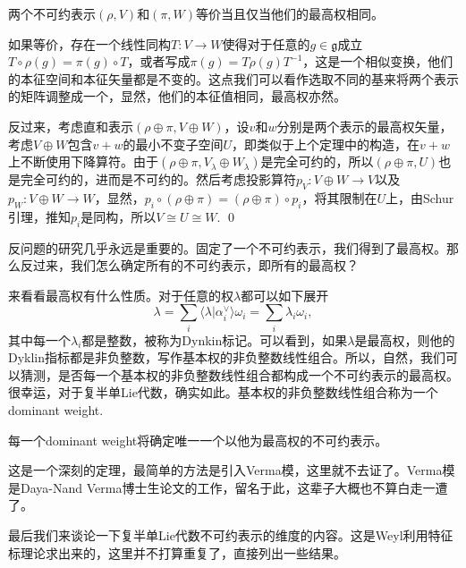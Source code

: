 \documentclass[9pt]{extarticle}
\newcommand{\lag}{{\mathfrak{g}}}
\begin{document}
\theo 两个不可约表示$(\rho,V)$和$(\pi,W)$等价当且仅当他们的最高权相同。

\proof 如果等价，存在一个线性同构$T:V\to W$使得对于任意的$g\in\lag$成立$T\circ \rho(g)=\pi(g)\circ T$，或者写成$\pi(g)=T\rho(g)T^{-1}$，这是一个相似变换，他们的本征空间和本征矢量都是不变的。这点我们可以看作选取不同的基来将两个表示的矩阵调整成一个，显然，他们的本征值相同，最高权亦然。

反过来，考虑直和表示$(\rho\oplus\pi,V\oplus W)$，设$v$和$w$分别是两个表示的最高权矢量，考虑$V\oplus W$包含$v+w$的最小不变子空间$U$，即类似于上个定理中的构造，在$v+w$上不断使用下降算符。由于$(\rho\oplus\pi,V_\lambda\oplus W_\lambda)$是完全可约的，所以$(\rho\oplus\pi,U)$也是完全可约的，进而是不可约的。然后考虑投影算符$p_V:V\oplus W\to V$以及$p_W:V\oplus W\to W$，显然，$p_i\circ (\rho\oplus\pi)=(\rho\oplus\pi)\circ p_i$，将其限制在$U$上，由Schur引理，推知$p_i$是同构，所以$V\cong U\cong W$. \qed

\para 反问题的研究几乎永远是重要的。固定了一个不可约表示，我们得到了最高权。那么反过来，我们怎么确定所有的不可约表示，即所有的最高权？

来看看最高权有什么性质。对于任意的权$\lambda$都可以如下展开
\[
	\lambda=\sum_i \langle \lambda|\alpha_i^\vee\rangle \omega_i=\sum_i \lambda_i \omega_i,
\]
其中每一个$\lambda_i$都是整数，被称为Dynkin标记。可以看到，如果$\lambda$是最高权，则他的Dyklin指标都是非负整数，写作基本权的非负整数线性组合。所以，自然，我们可以猜测，是否每一个基本权的非负整数线性组合都构成一个不可约表示的最高权。很幸运，对于复半单Lie代数，确实如此。基本权的非负整数线性组合称为一个dominant weight.



\theo 每一个dominant weight将确定唯一一个以他为最高权的不可约表示。

这是一个深刻的定理，最简单的方法是引入Verma模，这里就不去证了。Verma模是Daya-Nand Verma博士生论文的工作，留名于此，这辈子大概也不算白走一遭了。

\para 最后我们来谈论一下复半单Lie代数不可约表示的维度的内容。这是Weyl利用特征标理论求出来的，这里并不打算重复了，直接列出一些结果。
\end{document}

